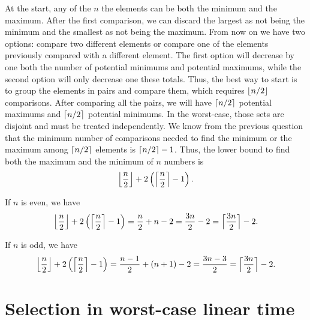 \begin{enumerate}
\begin{framed}
At the start, any of the $n$ the elements can be both the minimum and the
maximum. After the first comparison, we can discard the largest as not being the
minimum and the smallest as not being the maximum. From now on we have two
options: compare two different elements or compare one of the elements
previously compared with a different element. The first option will decrease by
one both the number of potential minimums and potential maximums, while the
second option will only decrease one these totals. Thus, the best way to start
is to group the elements in pairs and compare them, which requires $\lfloor n/2\rfloor$
comparisons. After comparing all the pairs, we will have $\lceil n/2\rceil$ potential
maximums and $\lceil n/2\rceil$ potential minimums. In the worst-case, those sets are
disjoint and must be treated independently. We know from the previous question
that the minimum number of comparisons needed to find the minimum or the maximum
among $\lceil n/2\rceil$ elements is $\lceil n/2\rceil - 1$. Thus, the lower bound to find
both the maximum and the minimum of $n$ numbers is
\[
  \Bigl\lfloor \frac{n}{2} \Bigr\rfloor + 2 \left( \Bigl\lceil \frac{n}{2} \Bigr\rceil - 1 \right).
\]

If $n$ is even, we have
\[
  \Bigl\lfloor \frac{n}{2} \Bigr\rfloor + 2 \left( \Bigl\lceil \frac{n}{2} \Bigr\rceil - 1 \right)
  = \frac{n}{2} + n - 2
  = \frac{3n}{2} - 2
  = \Bigl\lceil \frac{3n}{2} \Bigr\rceil - 2.
\]

If $n$ is odd, we have
\[
  \Bigl\lfloor \frac{n}{2} \Bigr\rfloor + 2 \left( \Bigl\lceil \frac{n}{2} \Bigr\rceil - 1 \right)
  = \frac{n - 1}{2} + (n + 1) - 2
  = \frac{3n - 3}{2}
  = \Bigl\lceil \frac{3n}{2} \Bigr\rceil - 2.
\]
\end{framed}

\end{enumerate}

\newpage

\section{Selection in worst-case linear time}

